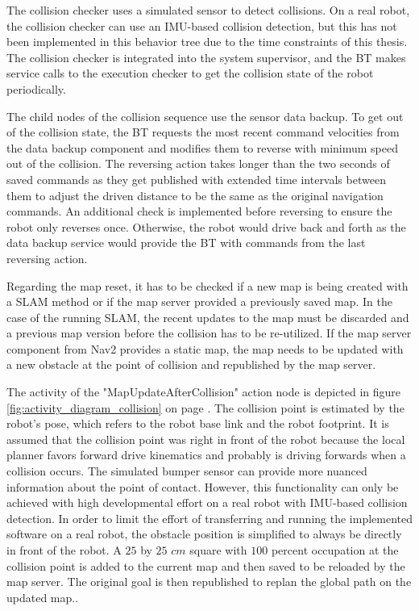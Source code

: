 The collision checker uses a simulated sensor to detect collisions. On a real robot, the collision checker can use an IMU-based collision detection, but this has not been implemented in this behavior tree due to the time constraints of this thesis. The collision checker is integrated into the system supervisor, and the BT makes service calls to the execution checker to get the collision state of the robot periodically. 

The child nodes of the collision sequence use the sensor data backup. To get out of the collision state, the BT requests the most recent command velocities from the data backup component and modifies them to reverse with minimum speed out of the collision. The reversing action takes longer than the two seconds of saved commands as they get published with extended time intervals between them to adjust the driven distance to be the same as the original navigation commands. An additional check is implemented before reversing to ensure the robot only reverses once. Otherwise, the robot would drive back and forth as the data backup service would provide the BT with commands from the last reversing action. 

%

Regarding the map reset, it has to be checked if a new map is being created with a SLAM method or if the map server provided a previously saved map. In the case of the running SLAM, the recent updates to the map must be discarded and a previous map version before the collision has to be re-utilized. If the map server component from Nav2 provides a static map, the map needs to be updated with a new obstacle at the point of collision and republished by the map server. 

The activity of the "MapUpdateAfterCollision" action node is depicted in figure \ref{fig:activity_diagram_collision} on page \pageref{fig:activity_diagram_collision}. The collision point is estimated by the robot's pose, which refers to the robot base link and the robot footprint. It is assumed that the collision point was right in front of the robot because the local planner favors forward drive kinematics and probably is driving forwards when a collision occurs. The simulated bumper sensor can provide more nuanced information about the point of contact. However, this functionality can only be achieved with high developmental effort on a real robot with IMU-based collision detection. In order to limit the effort of transferring and running the implemented software on a real robot, the obstacle position is simplified to always be directly in front of the robot. A $25$ by $25$ $cm$ square with $100$ percent occupation at the collision point is added to the current map and then saved to be reloaded by the map server. The original goal is then republished to replan the global path on the updated map.. 

